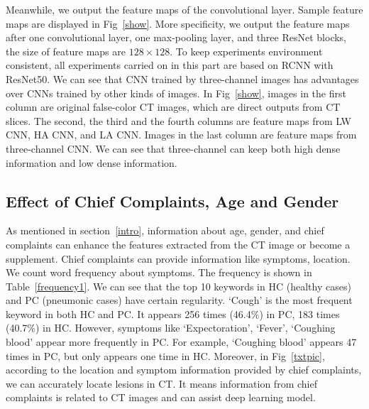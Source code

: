 Meanwhile, we output the feature maps of the convolutional layer. Sample feature maps are displayed in Fig~\ref{show}. More specificity, we output the feature maps after one convolutional layer, one max-pooling layer, and three ResNet blocks, the size of feature maps are $128 \times 128$. To keep experiments environment consistent, all experiments carried on in this part are based on RCNN with ResNet50. We can see that CNN trained by three-channel images has advantages over CNNs trained by other kinds of images. 
In Fig~\ref{show}, images in the first column are original false-color CT images, which are direct outputs from CT slices. The second, the third and the fourth columns are feature maps from LW CNN, HA CNN, and LA CNN. Images in the last column are feature maps from three-channel CNN. We can see that three-channel can keep both high dense information and low dense information. 

\subsection{Effect of Chief Complaints, Age and Gender}
\label{complaintsagegender}
As mentioned in section~\ref{intro}, information about age, gender, and chief complaints can enhance the features extracted from the CT image or become a supplement. Chief complaints can provide information like symptoms, location.
We count word frequency about symptoms. The frequency is shown in Table~\ref{frequency1}. We can see that the top 10 keywords in HC (healthy cases) and PC (pneumonic cases) have certain regularity. `Cough' is the most frequent keyword in both HC and PC. It appears 256 times (46.4\%) in PC, 183 times (40.7\%) in HC. However, symptoms like `Expectoration', `Fever', `Coughing blood' appear more frequently in PC. For example, `Coughing blood' appears 47 times in PC, but only appears one time in HC. 
Moreover, in Fig~\ref{txtpic}, according to the location and symptom information provided by chief complaints, we can accurately locate lesions in CT. It means information from chief complaints is related to CT images and can assist deep learning model.

